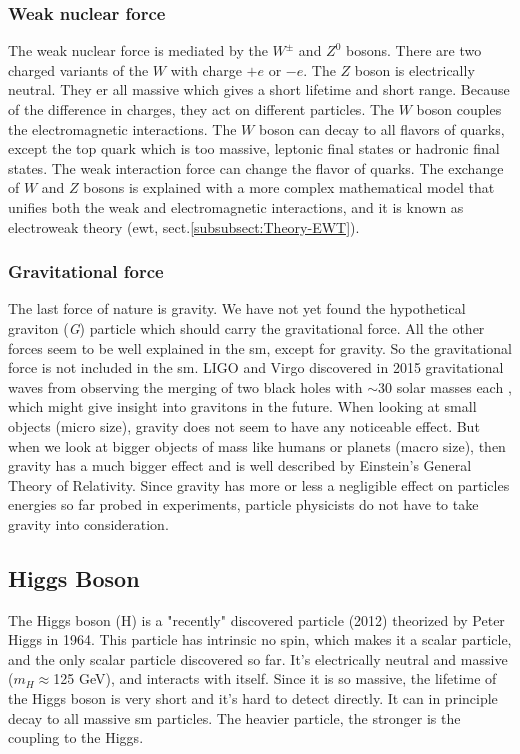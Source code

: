 \documentclass[a4paper, american, 12pt]{report}
\begin{document}
	
	\subsubsection{Weak nuclear force}
	\label{subsubsect:Theory-Weak_Force}
	The weak nuclear force is mediated by the $W^{\pm}$ and $Z^0$ bosons. There are two charged variants of the $W$ with charge $+e$ or $-e$. The $Z$ boson is electrically neutral. They er all massive which gives a short lifetime and short range. Because of the difference in charges, they act on different particles. The $W$ boson couples the electromagnetic interactions. The $W$ boson can decay to all flavors of quarks, except the top quark which is too massive, leptonic final states or hadronic final states. The weak interaction force can change the flavor of quarks. The exchange of $W$ and $Z$ bosons is explained with a more complex mathematical model that unifies both the weak and electromagnetic interactions, and it is known as electroweak theory (\acrshort{ewt}, sect.\ref{subsubsect:Theory-EWT}).
	
	
	\subsubsection{Gravitational force}
	\label{subsubsect:Theory-G_Force}
	The last force of nature is gravity. We have not yet found the hypothetical graviton (\textit{G}) particle which should carry the gravitational force. All the other forces seem to be well explained in the \acrshort{sm}, except for gravity. So the gravitational force is not included in the \acrshort{sm}. LIGO and Virgo discovered in 2015 gravitational waves from observing the merging of two black holes with $\sim$30 solar masses each \cite{GravitationalwaveDiscovery}, which might give insight into gravitons in the future. When looking at small objects (micro size), gravity does not seem to have any noticeable effect. But when we look at bigger objects of mass like humans or planets (macro size), then gravity has a much bigger effect and is well described by Einstein's General Theory of Relativity. Since gravity has more or less a negligible effect on particles energies so far probed in experiments, particle physicists do not have to take gravity into consideration.
	
	
	\subsection{Higgs Boson}
	\label{subsect:Theory-Higgs}
	The Higgs boson (H) is a "recently" discovered particle (2012) \cite{HiggsATLAS}\cite{HiggsCMS} theorized by Peter Higgs in 1964. This particle has intrinsic no spin, which makes it a scalar particle, and the only scalar particle discovered so far. It's electrically neutral and massive ($m_H\approx$125 GeV), and interacts with itself. Since it is so massive, the lifetime of the Higgs boson is very short and it's hard to detect directly. It can in principle decay to all massive \acrshort{sm} particles. The heavier particle, the stronger is the coupling to the Higgs.
	
\end{document}
